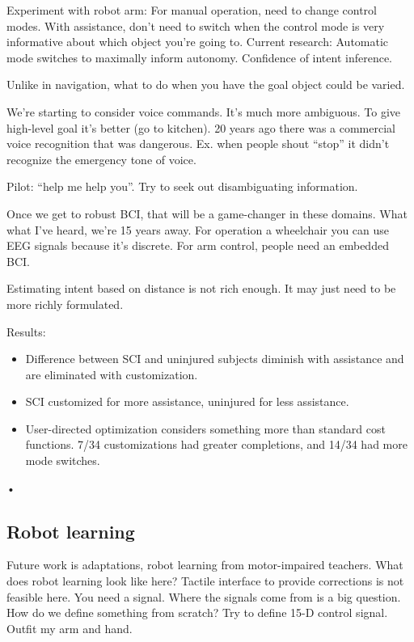 Experiment with robot arm: 
For manual operation, need to change control modes. With assistance, don't need to switch when the control mode is very informative about which object you're going to. Current research: Automatic mode switches to maximally inform autonomy. Confidence of intent inference.

Unlike in navigation, what to do when you have the goal object could be varied. %

We're starting to consider voice commands. It's much more ambiguous. To give high-level goal it's better (go to kitchen). 20 years ago there was a commercial voice recognition that was dangerous. Ex. when people shout ``stop'' it didn't recognize the emergency tone of voice.

Pilot: ``help me help you''. Try to seek out disambiguating information.

Once we get to robust BCI, that will be a game-changer in these domains. What what I've heard, we're 15 years away. For operation a wheelchair you can use EEG signals because it's discrete. 
For arm control, people need an embedded BCI. 


Estimating intent based on distance is not rich enough. It may just need to be more richly formulated.

Results: 
\begin{itemize}
\item
Difference between SCI and uninjured subjects diminish with assistance and are eliminated with customization.
\item
SCI customized for more assistance, uninjured for less assistance.
\item
User-directed optimization considers something more than standard cost functions.
7/34 customizations had greater completions, and 14/34 had more mode switches.
\end{itemize}•

\subsection{Robot learning}
Future work is adaptations, robot learning from motor-impaired teachers. %
What does robot learning look like here? Tactile interface to provide corrections is not feasible here. You need a signal.  Where the signals come from is a big question. How do we define something from scratch? Try to define 15-D control signal. Outfit my arm and hand.

